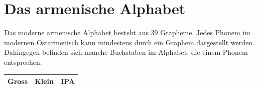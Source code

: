 \documentclass[11pt,a4paper,headsepline,twoside,toc=bibliography]{scrreprt}
\begin{document}
\newpage

\section{Das armenische Alphabet}
\label{appendix:alphabeth_am}

Das moderne armenische Alphabet besteht aus 39 Grapheme. Jedes Phonem im modernen Ostarmenisch kann mindestens durch ein Graphem dargestellt werden. Dahingegen befinden sich manche Buchstaben im Alphabet, die einem Phonem entsprechen. \\    

{
\renewcommand{\arraystretch}{1.2}
\centering
\begin{tabular}{@{}|l|l|l|}
	
\toprule
	
\textbf{Gross} & \textbf{Klein} & \textbf{IPA} \\
	
\midrule
		

\end{tabular}}
\end{document}
